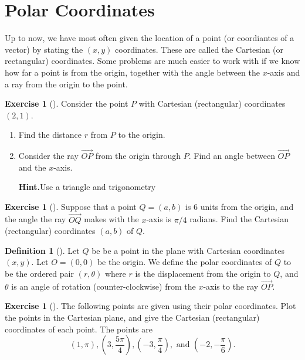 \documentclass[10pt,]{book}
\theoremstyle{plain}
\theoremstyle{definition}
\newtheorem{definition}[theorem]{Definition}
\theoremstyle{definition}
\theoremstyle{definition}
\theoremstyle{definition}
\newtheorem{exploration}[project]{Exercise}
\theoremstyle{definition}
\numberwithin{equation}{section}
\newcommand{\ds}{\displaystyle}
\begin{document}
\section[{Polar Coordinates}]{Polar Coordinates}\label{ch05_01_polar_coordinates}
Up to now, we have most often given the location of a point (or coordiantes of a vector) by stating the \((x,y)\) coordinates. These are called the Cartesian (or rectangular) coordinates. Some problems are much easier to work with if we know how far a point is from the origin, together with the angle between the \(x\)-axis and a ray from the origin to the point.%
\begin{exploration}[]\label{exploration-83}
Consider the point \(P\) with Cartesian (rectangular) coordinates \((2,1)\).%
\begin{enumerate}[font=\bfseries,label=(\alph*),ref=\alph*]
\item\label{task-140} Find the distance \(r\) from \(P\) to the origin.%
\item\label{task-141} Consider the ray \(\stackrel{\rightarrow}{OP}\) from the origin through \(P\). Find an angle between \(\vec{OP}\) and the \(x\)-axis.%
\par\medskip\noindent%
\textbf{Hint.}\quad Use a triangle and trigonometry%
\end{enumerate}
\end{exploration}
\begin{exploration}[]\label{exploration-84}
Suppose that a point \(Q=(a,b)\) is 6 units from the origin, and the angle the ray \(\vec{OQ}\) makes with the \(x\)-axis is \(\pi/4\) radians. Find the Cartesian (rectangular) coordinates \((a,b)\) of \(Q\).%
\end{exploration}
\begin{definition}[{}]\label{definition-21}
Let \(Q\) be be a point in the plane with Cartesian coordinates \((x,y)\). Let \(O=(0,0)\) be the origin. We define the polar coordinates of \(Q\) to be the ordered pair \((r,\theta)\) where \(r\) is the displacement from the origin to \(Q\), and \(\theta\) is an angle of rotation (counter-clockwise) from the \(x\)-axis to the ray \(\vec {OP}\).%
\end{definition}
\begin{exploration}[]\label{exploration-85}
The following points are given using their polar coordinates. Plot the points in the Cartesian plane, and give the Cartesian (rectangular) coordinates of each point. The points are%
\begin{equation*}
(1,\pi), 
\ds \left( 3,\frac{5\pi}{4}\right),
\ds \left( -3,\frac{\pi}{4}\right),\text{ and } 
\ds \left( -2,-\frac{\pi}{6}\right).
\end{equation*}
%
\end{exploration}
\end{document}
